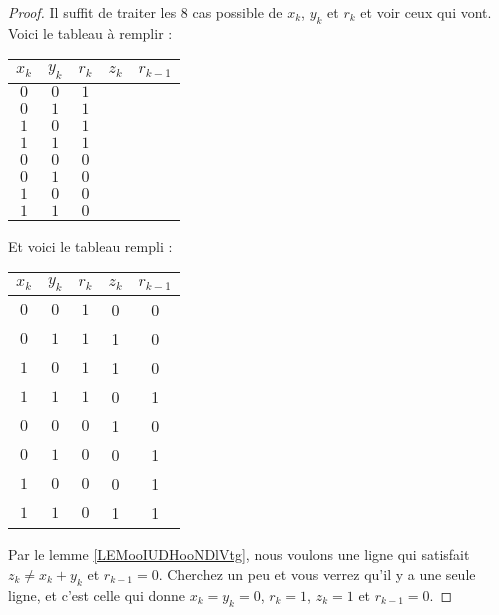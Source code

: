 \begin{proof}
	Il suffit de traiter les 8 cas possible de \( x_k\), \( y_k\) et \( r_k\) et voir ceux qui vont. Voici le tableau à remplir :
	\begin{center}
		\begin{tabular}{c|c|c|c|c}
			\( x_k\) & \( y_k\) & \( r_k\) & \( z_k\) & \( r_{k-1}\) \\
			\hline
			\( 0\)   & \( 0\)   & \( 1\)   &          &              \\
			\hline
			\( 0\)   & \( 1\)   & \( 1\)   &          &              \\
			\hline
			\( 1\)   & \( 0\)   & \( 1\)   &          &              \\
			\hline
			\( 1\)   & \( 1\)   & \( 1\)   &          &              \\
			\hline
			\( 0\)   & \( 0\)   & \( 0\)   &          &              \\
			\hline
			\( 0\)   & \( 1\)   & \( 0\)   &          &              \\
			\hline
			\( 1\)   & \( 0\)   & \( 0\)   &          &              \\
			\hline
			\( 1\)   & \( 1\)   & \( 0\)   &          &              \\
		\end{tabular}
	\end{center}
	Et voici le tableau rempli :
	\begin{center}
		\begin{tabular}{c|c|c|c|c}
			\( x_k\) & \( y_k\) & \( r_k\) & \( z_k\) & \( r_{k-1}\) \\
			\hline
			\( 0\)   & \( 0\)   & \( 1\)   & 0        & 0            \\
			\hline
			\( 0\)   & \( 1\)   & \( 1\)   & 1        & 0            \\
			\hline
			\( 1\)   & \( 0\)   & \( 1\)   & 1        & 0            \\
			\hline
			\( 1\)   & \( 1\)   & \( 1\)   & 0        & 1            \\
			\hline
			\( 0\)   & \( 0\)   & \( 0\)   & 1        & 0            \\
			\hline
			\( 0\)   & \( 1\)   & \( 0\)   & 0        & 1            \\
			\hline
			\( 1\)   & \( 0\)   & \( 0\)   & 0        & 1            \\
			\hline
			\( 1\)   & \( 1\)   & \( 0\)   & 1        & 1            \\
		\end{tabular}
	\end{center}
	Par le lemme \ref{LEMooIUDHooNDlVtg}, nous voulons une ligne qui satisfait \( z_k\neq x_k+y_k\) et \( r_{k-1}=0\). Cherchez un peu et vous verrez qu'il y a une seule ligne, et c'est celle qui donne \( x_k=y_k=0\), \( r_k=1\), \( z_k=1\) et \( r_{k-1}=0\).
\end{proof}

